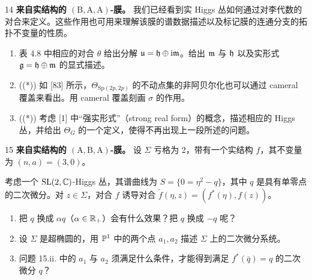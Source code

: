 \begin{prob}{14} \textbf{来自实结构的 $(\mathrm{B},\mathrm{A},\mathrm{A})$-膜。} 我们已经看到实 Higgs 丛如何通过对李代数的对合来定义。这些作用也可用来理解该膜的谱数据描述以及标记膜的连通分支的拓扑不变量的性质。
\begin{enumerate}[label=(\roman*),leftmargin=2.2em]
\item 表 4.8 中相应的对合 $\theta$ 给出分解 $\mathfrak{u} = \mathfrak{h} \oplus \mathrm{i}\mathfrak{m}$。给出 $\mathfrak{m}$ 与 $\mathfrak{h}$ 以及实形式 $\mathfrak{g} = \mathfrak{h}\oplus\mathfrak{m}$ 的显式描述。
\item ((*)) 如 [83] 所示，$\Theta_{\mathrm{Sp}(2p,2p)}$ 的不动点集的非阿贝尔化也可以通过 cameral 覆盖来看出。用 cameral 覆盖刻画 $\sigma$ 的作用。
\item ((*)) 考虑 [1] 中“强实形式”（strong real form）的概念，描述相应的 Higgs 丛，并给出 $\Theta_G$ 的一个定义，使得不再出现上一段所述的问题。
\end{enumerate}
\end{prob}

\begin{prob}{15} \textbf{来自实结构的 $(\mathrm{A},\mathrm{B},\mathrm{A})$-膜。} 设 $\Sigma$ 亏格为 2，带有一个实结构 $f$，其不变量为 $(n,a) = (3,0)$。

考虑一个 $\mathrm{SL}(2,\mathbb{C})$-Higgs 丛，其谱曲线为 $S = \{0 = \eta^2 - q\}$，其中 $q$ 是具有单零点的二次微分。对 $z\in\Sigma$，对合 $f$ 诱导对合 $\tilde f(\eta,z) = (f^*(\eta), f(z))$。
\begin{enumerate}[label=(\roman*),leftmargin=2.2em]
\item 把 $q$ 换成 $\alpha q$（$\alpha\in\mathbb{R}_+$）会有什么效果？把 $q$ 换成 $-q$ 呢？
\item 设 $\Sigma$ 是超椭圆的，用 $\mathbb{P}^1$ 中的两个点 $a_1,a_2$ 描述 $\Sigma$ 上的二次微分系统。
\item 问题 15.ii. 中的 $a_1$ 与 $a_2$ 须满足什么条件，才能得到满足 $f^*(\bar q) = q$ 的二次微分 $q$？
\end{enumerate}
\end{prob}
